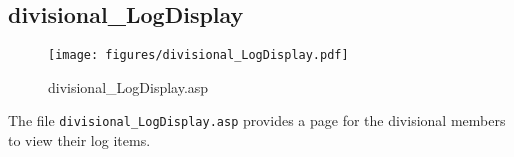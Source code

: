 \subsection{divisional\_LogDisplay}
\begin{figure}[htb]
    \begin{center}
        \texttt{[image: figures/divisional\_LogDisplay.pdf]}
    \end{center}
    \caption{divisional\_LogDisplay.asp}
    \label{fig:divisional_LogDisplay}
\end{figure}

The file \verb|divisional_LogDisplay.asp| provides a page for the divisional
members to view their log items.
